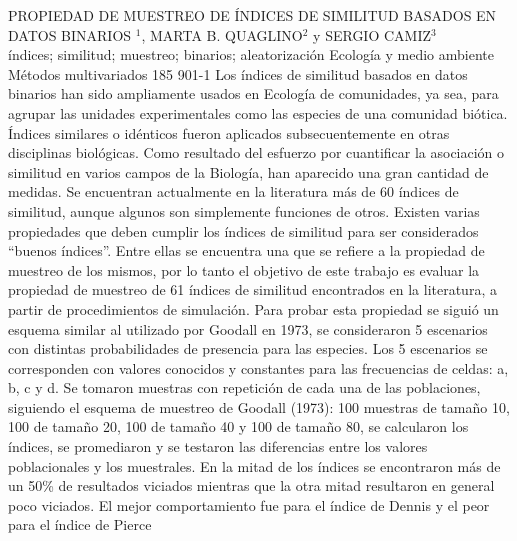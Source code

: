 \A
{PROPIEDAD DE MUESTREO DE ÍNDICES DE SIMILITUD BASADOS EN DATOS BINARIOS}
{$^1$, MARTA B. QUAGLINO$^2$ y SERGIO CAMIZ$^3$}
{
\\}
{índices; similitud; muestreo; binarios; aleatorización} 
 {Ecología y medio ambiente} 
 {Métodos multivariados} 
 {185} 
 {901-1}
{Los índices de similitud basados en datos binarios han sido ampliamente usados en Ecología de comunidades, ya sea, para agrupar las unidades experimentales como las especies de una comunidad biótica. Índices similares o idénticos fueron aplicados subsecuentemente en otras disciplinas biológicas. Como resultado del esfuerzo por cuantificar la asociación o similitud en varios campos de la Biología, han aparecido una gran cantidad de medidas. Se encuentran actualmente en la literatura más de 60 índices de similitud, aunque algunos son simplemente funciones de otros. Existen varias propiedades que deben cumplir los índices de similitud para ser considerados “buenos índices”. Entre ellas se encuentra una que se refiere a la propiedad de muestreo de los mismos, por lo tanto el objetivo de este trabajo es evaluar la propiedad de muestreo de 61 índices de similitud encontrados en la literatura, a partir de procedimientos de simulación. Para probar esta propiedad se siguió un esquema similar al utilizado por Goodall en 1973, se consideraron 5 escenarios con distintas probabilidades de presencia para las especies. Los 5 escenarios se corresponden con valores conocidos y constantes para las frecuencias de celdas: a, b, c y d. Se tomaron muestras con repetición de cada una de las poblaciones, siguiendo el esquema de muestreo de Goodall (1973): 100 muestras de tamaño 10, 100 de tamaño 20, 100 de tamaño 40 y 100 de tamaño 80, se calcularon los índices, se promediaron y se testaron las diferencias entre los valores poblacionales y los muestrales. En la mitad de los índices se encontraron más de un 50\% de resultados viciados mientras que la otra mitad resultaron en general poco viciados. El mejor comportamiento fue para el índice de Dennis y el peor para el índice de Pierce}
